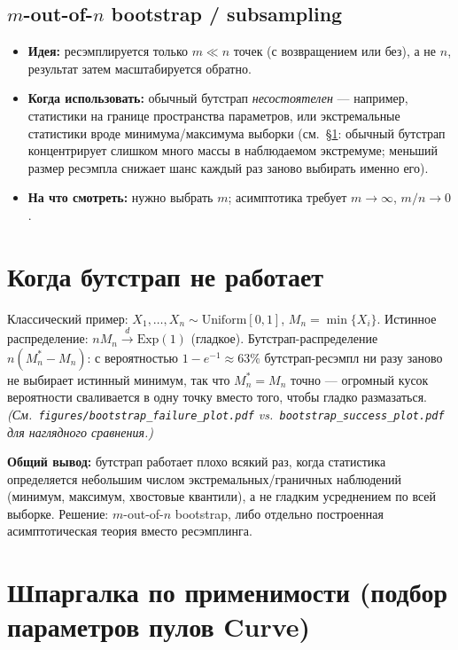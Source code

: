 \documentclass[11pt]{article}
\begin{document}
\subsection*{$m$-out-of-$n$ bootstrap / subsampling}
\begin{itemize}
  \item \textbf{Идея:} ресэмплируется только $m \ll n$ точек (с возвращением или без), а не $n$, результат затем масштабируется обратно.
  \item \textbf{Когда использовать:} обычный бутстрап \emph{несостоятелен} --- например, статистики на границе пространства параметров, или экстремальные статистики вроде минимума/максимума выборки (см.\ \S\ref{sec:fails}: обычный бутстрап концентрирует слишком много массы в наблюдаемом экстремуме; меньший размер ресэмпла снижает шанс каждый раз заново выбирать именно его).
  \item \textbf{На что смотреть:} нужно выбрать $m$; асимптотика требует $m\to\infty$, $m/n \to 0$.
\end{itemize}

\section{Когда бутстрап не работает}
\label{sec:fails}

Классический пример: $X_1,\dots,X_n \sim \mathrm{Uniform}[0,1]$, $M_n = \min\{X_i\}$. Истинное распределение: $nM_n \xrightarrow{d} \mathrm{Exp}(1)$ (гладкое). Бутстрап-распределение $n(M_n^*-M_n)$: с вероятностью $1-e^{-1}\approx 63\%$ бутстрап-ресэмпл ни разу заново не выбирает истинный минимум, так что $M_n^*=M_n$ точно --- огромный кусок вероятности сваливается в одну точку вместо того, чтобы гладко размазаться. \emph{(См.\ \texttt{figures/bootstrap\_failure\_plot.pdf} vs.\ \texttt{bootstrap\_success\_plot.pdf} для наглядного сравнения.)}

\textbf{Общий вывод:} бутстрап работает плохо всякий раз, когда статистика определяется небольшим числом экстремальных/граничных наблюдений (минимум, максимум, хвостовые квантили), а не гладким усреднением по всей выборке. Решение: $m$-out-of-$n$ bootstrap, либо отдельно построенная асимптотическая теория вместо ресэмплинга.

\section{Шпаргалка по применимости (подбор параметров пулов Curve)}
\end{document}
